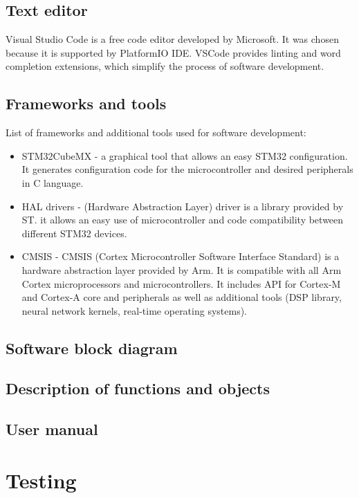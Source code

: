 \documentclass[a4paper,twoside,12pt]{book}
\begin{document}
\section{Text editor}
Visual Studio Code is a free code editor developed by Microsoft.
It was chosen because it is supported by PlatformIO IDE.
VSCode provides linting and word completion extensions,
which simplify the process of software development.

\section{Frameworks and tools}
List of frameworks and additional tools used for software development:

\begin{itemize}
    \item STM32CubeMX
    - a graphical tool that allows an easy STM32 configuration.
    It generates configuration code for the microcontroller and desired peripherals in C language.
    \item HAL drivers
    - (Hardware Abstraction Layer) driver is a library provided by ST.
    it allows an easy use of microcontroller and code compatibility between different STM32 devices.
    \item CMSIS
    - CMSIS (Cortex Microcontroller Software Interface Standard) is a hardware abstraction layer provided by Arm.
    It is compatible with all Arm Cortex microprocessors and microcontrollers.
    It includes API for Cortex-M and Cortex-A core and peripherals as well as additional tools
    (DSP library, neural network kernels, real-time operating systems).
\end{itemize}

\section{Software block diagram}

\section{Description of functions and objects}

\section{User manual}

\newpage



\chapter{Testing}
\end{document}

